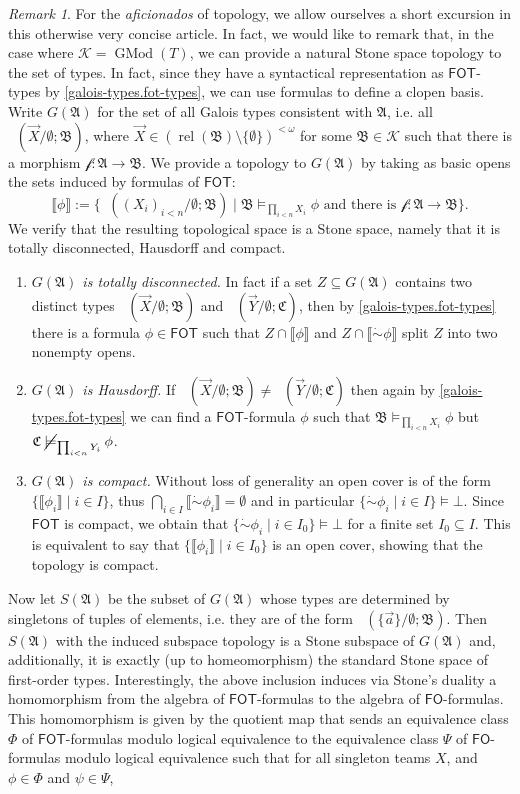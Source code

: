 \documentclass[a4paper]{amsart}
\theoremstyle{definition}
\theoremstyle{remark}
\newtheorem*{remark}{Remark}
\newcommand{\A}{\mathcal{A}}
\newcommand{\B}{\mathcal{B}}
\newcommand{\C}{\mathcal{C}}
\newcommand{\cneg}{\mathord{\dot{\sim}}}
\newcommand\fol{\mathsf{FO}}
\newcommand\fot{\mathsf{FOT}}
\DeclareMathOperator{\rel}{rel}
\newcommand\nmodels{\mathbin{\cancel{\models}}}
\newcommand{\K}{\mathcal{K}}
\theoremstyle{definition}
\renewcommand{\A}{\mathfrak{A}}
\renewcommand{\B}{\mathfrak{B}}
\renewcommand{\C}{\mathfrak{C}}
\DeclareMathOperator{\gtype}{tp_g}
\newcommand{\f}{\mathcal{f}}
\DeclareMathOperator{\GMod}{GMod}
\begin{document}
\begin{remark}
    For the \emph{aficionados} of topology, we allow ourselves a short excursion in this otherwise very concise article.  In fact, we would like to remark that, in the case where $\K=\GMod(T)$, we can provide a natural Stone space topology to the set of types. In fact, since they have a syntactical representation as $\fot$-types by \cref{galois-types.fot-types}, we can use formulas to define a clopen basis. Write $G(\A)$ for the set of all Galois types consistent with $\A$, i.e. all $\gtype( \vec X / \emptyset; \B)$, where  $\vec X\in(\rel(\B)\setminus\{\emptyset\})^{<\omega}$ for some $\B\in\K$ such that there is a morphism $\f\colon\A\to \B$.
    We provide a topology  to $G(\A)$ by taking as basic opens the sets induced by formulas of $\fot$:
    \[
        \llbracket \phi \rrbracket :=    \{ \gtype((X_i)_{i<n}/\emptyset;\B) \mid \B \models_{\prod_{i<n}X_i} \phi \text{ and there is } \f:\A\to \B \}.
    \]
    We verify that the resulting topological space  is a Stone space, namely that it is totally disconnected, Hausdorff and compact.
    \begin{enumerate}
        \item \textit{$G(\A)$ is totally disconnected.} In fact if  a set $Z\subseteq G(\A)$ contains two distinct types $ \gtype(\vec X/\emptyset;\B) $ and $ \gtype(\vec Y/\emptyset;\C) $, then by \cref{galois-types.fot-types} there is a formula $\phi\in \fot$ such that $Z\cap \llbracket \phi \rrbracket$ and   $Z\cap \llbracket \cneg\phi \rrbracket$ split $Z$ into two nonempty opens.
        \item \textit{$G(\A)$ is Hausdorff.} If $ \gtype(\vec X/\emptyset;\B) \neq  \gtype(\vec Y/\emptyset;\C) $ then again by \cref{galois-types.fot-types} we can find a $\fot$-formula $\phi$ such that $\B\models_{\prod_{i<n}X_i} \phi$ but $\C\nmodels_{\prod_{i<n}Y_i}\phi$.
        \item \textit{$G(\A)$ is compact.} Without loss of generality an open cover is of the form $\{\llbracket \phi_i \rrbracket \mid i\in I \}$, thus $ \bigcap_{i\in I}\llbracket \cneg\phi_i \rrbracket =\emptyset$ and in particular $\{  \cneg\phi_i \mid i\in I \}\models \bot$. Since $\fot$ is compact, we obtain that $\{ \cneg \phi_i \mid i\in I_0 \}\models \bot$ for a finite set $I_0\subseteq I$. This is equivalent to say that $ \{ \llbracket \phi_i \rrbracket \mid i \in I_0\}$ is an open cover, showing that the topology is compact.
    \end{enumerate}
    Now let $S(\A)$ be the subset of $G(\A)$ whose types are determined by singletons of tuples of elements, i.e. they are of the form $ \gtype(\{\vec a\}/\emptyset;\B)$. Then $S(\A)$ with the induced subspace topology is a Stone subspace of $G(\A)$ and, additionally, it is exactly (up to homeomorphism) the standard Stone space of first-order types. Interestingly, the above inclusion induces via Stone's duality a homomorphism from the algebra of $\fot$-formulas to the algebra of $\fol$-formulas. This homomorphism is given by the quotient map that sends an equivalence class $\Phi$ of $\fot$-formulas modulo logical equivalence to the equivalence class $\Psi$ of $\fol$-formulas modulo logical equivalence such that for all singleton teams $X$, and $\phi\in\Phi$ and $\psi\in\Psi$,

\end{remark}
\end{document}
